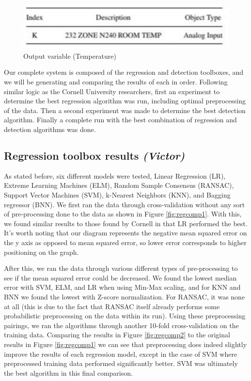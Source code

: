 \documentclass{acm_proc_article-sp}
\begin{document}
\begin{figure}[!h]
\centering
    \includegraphics[scale=0.3]{figures/output_variable.png}
\caption{Output variable (Temperature)} 
\label{fig:outputvariable}
\end{figure}

Our complete system is composed of the regression and detection toolboxes, and we will be generating and comparing the results of each in order. Following similar logic as the Cornell University researchers, first an experiment to determine the best regression algorithm was run, including optimal preprocessing of the data. Then a second experiment was made to determine the best detection algorithm. Finally a complete run with the best combination of regression and detection algorithms was done.

\subsection{Regression toolbox results \textit{(Victor)}}
As stated before, six different models were tested, Linear Regression (LR), Extreme Learning Machines (ELM), Random Sample Consensus (RANSAC), Support Vector Machines (SVM), k-Nearest Neighbors (KNN), and Bagging regressor (BNN). We first ran the data through cross-validation without any sort of pre-processing done to the data as shown in Figure \ref{fig:regcomp1}. With this, we found similar results to those found by Cornell in that LR performed the best. It's worth noting that our diagram represents the negative mean squared error on the y axis as opposed to mean squared error, so lower error corresponds to higher positioning on the graph.

After this, we ran the data through various different types of pre-processing to see if the mean squared error could be decreased. We found the lowest median error with SVM, ELM, and LR when using Min-Max scaling, and for KNN and BNN we found the lowest with Z-score normalization. For RANSAC, it was none at all (this is due to the fact that RANSAC itself already performs some probabilistic preprocessing on the data within its run). Using these preprocessing pairings, we ran the algorithms through another 10-fold cross-validation on the training data. Comparing the results in Figure \ref{fig:regcomp2} to the original results in Figure \ref{fig:regcomp1} we can see that preprocessing does indeed slightly improve the results of each regression model, except in the case of SVM where preprocessed training data performed significantly better. SVM was ultimately the best algorithm in this final comparison.
\end{document}
